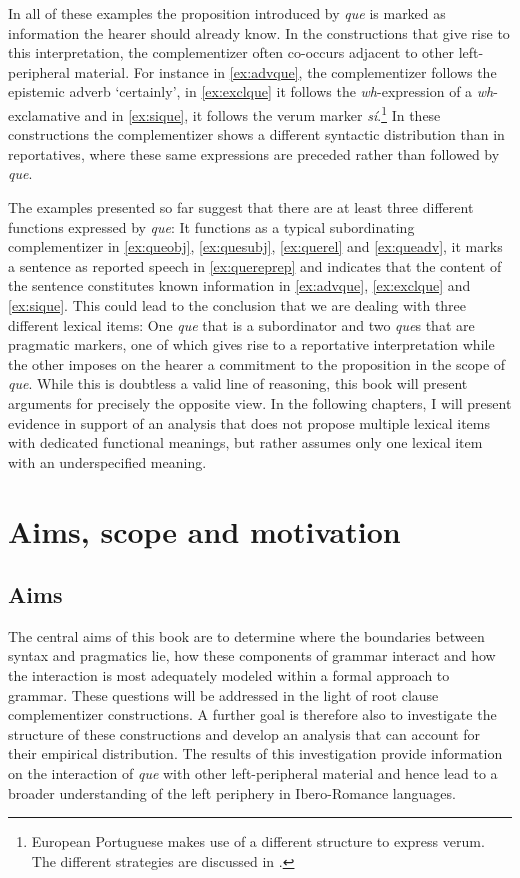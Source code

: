 In all of these examples the proposition introduced by \emph{que} is marked as  information the hearer should already know.   In the constructions that give rise to this interpretation, the complementizer often co-occurs adjacent to other left-peripheral material. For instance in \eqref{ex:advque}, the complementizer follows the epistemic adverb `certainly', in \eqref{ex:exclque} it follows the \textit{wh}-expression of a \textit{wh}-exclamative and in \eqref{ex:sique}, it follows the verum marker \emph{sí}.\footnote{European Portuguese makes use of a different structure to express verum. The different strategies are discussed  in .} In these constructions the complementizer shows a different syntactic distribution than in reportatives, where these same expressions are preceded rather than followed by \emph{que}. 

The examples presented so far suggest that there are at least three different functions expressed by \emph{que}: It functions as a typical subordinating complementizer in \eqref{ex:queobj}, \eqref{ex:quesubj}, \eqref{ex:querel} and \eqref{ex:queadv}, it marks a sentence as reported speech in \eqref{ex:quereprep} and indicates that the content of the sentence constitutes known information in \eqref{ex:advque},  \eqref{ex:exclque} and \eqref{ex:sique}.  This could lead to the conclusion that we are dealing with three different lexical items: One \emph{que} that is a subordinator and two \emph{que}s that are pragmatic markers, one of which gives rise to a reportative interpretation while the other  imposes on the hearer a commitment to the proposition in the scope of \emph{que}. While this is doubtless a valid line of reasoning, this book will present arguments  for  precisely the opposite view. In the following chapters, I will present evidence in support of an analysis that does not propose  multiple lexical items with dedicated functional meanings, but rather assumes only one lexical item  with an underspecified meaning.



\section{Aims,  scope and motivation}\label{sec:intscope}
\subsection{Aims}
The central  aims of this book are to determine where the boundaries between syntax and pragmatics lie, how these components of grammar interact and how the interaction is  most adequately modeled within a formal approach to grammar. These questions will be addressed in the light of root clause complementizer constructions. A further  goal is therefore also to investigate the structure of these constructions  and develop an analysis that can account for their empirical distribution. The results of this investigation  provide  information on the interaction of \emph{que} with other left-peripheral material and  hence lead to a broader understanding of the left periphery in Ibero-Romance languages.

